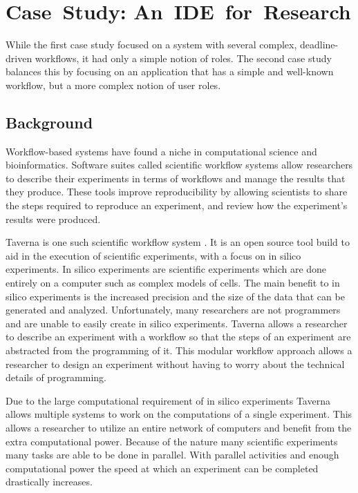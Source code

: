 \documentclass[document.tex]{subfiles}
\begin{document}
\chapter{Case~Study: An~IDE~for~Research}

While the first case study focused on a system with several complex, deadline-driven workflows, it had only a simple notion of roles. The second case study balances this by focusing on an application that has a simple and well-known workflow, but a more complex notion of user roles.

\section {Background}
\label{sec:case-study-research-background}

Workflow-based systems have found a niche in computational science and bioinformatics. Software suites called scientific workflow systems allow researchers to describe their experiments in terms of workflows and manage the results that they produce. These tools improve reproducibility by allowing scientists to share the steps required to reproduce an experiment, and review how the experiment's results were produced.

Taverna is one such scientific workflow system \cite{taverna-website}. It is an open source tool build to aid in the execution of scientific experiments, with a focus on in silico experiments. In silico experiments are scientific experiments which are done entirely on a computer such as complex models of cells. The main benefit to in silico experiments is the increased precision and the size of the data that can be generated and analyzed. Unfortunately, many researchers are not programmers and are unable to easily create in silico experiments. Taverna allows a researcher to describe an experiment with a workflow so that the steps of an experiment are abstracted from the programming of it. This modular workflow approach allows a researcher to design an experiment without having to worry about the technical details of programming.

Due to the large computational requirement of in silico experiments Taverna allows multiple systems to work on the computations of a single experiment. This allows a researcher to utilize an entire network of computers and benefit from the extra computational power. Because of the nature many scientific experiments many tasks are able to be done in parallel. With parallel activities and enough computational power the speed at which an experiment can be completed drastically increases.
\end{document}
